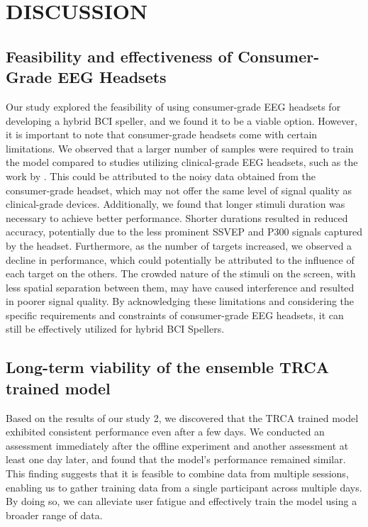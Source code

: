 \setlength{\footskip}{8mm}

\chapter{DISCUSSION}

\section{Feasibility and effectiveness of Consumer-Grade EEG Headsets }

Our study explored the feasibility of using consumer-grade EEG headsets for developing a hybrid BCI speller, and we found it to be a viable option. However, it is important to note that consumer-grade headsets come with certain limitations. We observed that a larger number of samples were required to train the model compared to studies utilizing clinical-grade EEG headsets, such as the work by \cite{xu2020implementing}. This could be attributed to the noisy data obtained from the consumer-grade headset, which may not offer the same level of signal quality as clinical-grade devices. Additionally, we found that longer stimuli duration was necessary to achieve better performance. Shorter durations resulted in reduced accuracy, potentially due to the less prominent SSVEP and P300 signals captured by the headset. Furthermore, as the number of targets increased, we observed a decline in performance, which could potentially be attributed to the influence of each target on the others. The crowded nature of the stimuli on the screen, with less spatial separation between them, may have caused interference and resulted in poorer signal quality. By acknowledging these limitations and considering the specific requirements and constraints of consumer-grade EEG headsets, it can still be effectively utilized for hybrid BCI Spellers. 

\section{Long-term viability of the ensemble TRCA trained model}

Based on the results of our study 2, we discovered that the TRCA trained model exhibited consistent performance even after a few days. We conducted an assessment immediately after the offline experiment and another assessment at least one day later, and found that the model's performance remained similar. This finding suggests that it is feasible to combine data from multiple sessions, enabling us to gather training data from a single participant across multiple days. By doing so, we can alleviate user fatigue and effectively train the model using a broader range of data.

